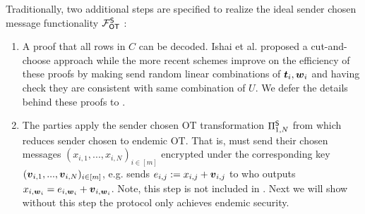 Traditionally, two additional steps are specified to realize the ideal sender chosen message functionality $\mathcal{F}_{\mathsf{OT}}^\mathsf{S}$ \cite{C:IKNP03,EC:ALSZ15,C:KelOrsSch15}:
\begin{enumerate}

	\item A proof that all rows in $C$ can be decoded. Ishai et al. \cite{C:IKNP03} proposed a cut-and-choose approach while the more recent schemes \cite{C:KelOrsSch15,RSA:OrrOrsSch17} improve on the efficiency of these proofs by making \rec send random linear combinations of $\boldsymbol{t}_i,\boldsymbol{w}_i$ and having \send check they are consistent with same combination of $U$. We defer the details behind these proofs to \cite{C:KelOrsSch15,RSA:OrrOrsSch17}.
	
	\item The parties apply the sender chosen OT transformation $\Pi^{\mathsf{S}}_{1,N}$ from  which reduces sender chosen to endemic OT. That is, \send must send their chosen messages $(x_{i,1},...,x_{i,N})_{i\in [m]}$ encrypted under the corresponding key $(\boldsymbol{v}_{i,1},...,\boldsymbol{v}_{i,N})_{i\in [m]}$, e.g. \send sends $e_{i,j}:=x_{i,j}+\boldsymbol{v}_{i,j}$ to \rec who outputs $x_{i,\boldsymbol{w}_i}=e_{i,\boldsymbol{w}_i}+\boldsymbol{v}_{i,\boldsymbol{w}_i}$. Note, this step is not included in . Next we will show without this step the protocol only achieves endemic security.
\end{enumerate}




